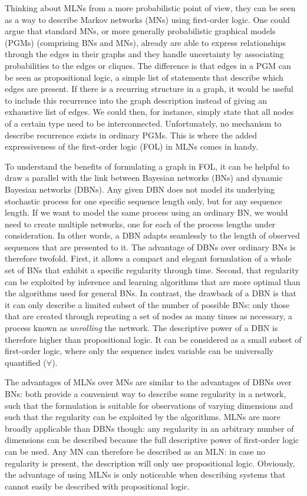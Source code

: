 \documentclass[letterpaper]{article} %
\begin{document}
Thinking about MLNs from a more probabilistic point of view, they can be seen as a way to describe Markov networks (MNs) using first-order logic. One could argue that standard MNs, or more generally probabilistic graphical models (PGMs) (comprising BNs and MNs), already are able to express relationships through the edges in their graphs and they handle uncertainty by associating probabilities to the edges or cliques. The difference is that edges in a PGM can be seen as propositional logic, a simple list of statements that describe which edges are present. If there is a recurring structure in a graph, it would be useful to include this recurrence into the graph description instead of giving an exhaustive list of edges. We could then, for instance, simply state that all nodes of a certain type need to be interconnected. Unfortunately, no mechanism to describe recurrence exists in ordinary PGMs. This is where the added expressiveness of the first-order logic (FOL) in MLNs comes in handy.

To understand the benefits of formulating a graph in FOL, it can be helpful to draw a parallel with the link between Bayesian networks (BNs) and dynamic Bayesian networks (DBNs). Any given DBN does not model its underlying stochastic process for one specific sequence length only, but for any sequence length. If we want to model the same process using an ordinary BN, we would need to create multiple networks, one for each of the process lengths under consideration. In other words, a DBN adapts seamlessly to the length of observed sequences that are presented to it. The advantage of DBNs over ordinary BNs is therefore twofold. First, it allows a compact and elegant formulation of a whole set of BNs that exhibit a specific regularity through time. Second, that regularity can be exploited by inference and learning algorithms that are more optimal than the algorithms used for general BNs. In contrast, the drawback of a DBN is that it can only describe a limited subset of the number of possible BNs: only those that are created through repeating a set of nodes as many times as necessary, a process known as \emph{unrolling} the network. The descriptive power of a DBN is therefore higher than propositional logic. It can be considered as a small subset of first-order logic, where only the sequence index variable can be universally quantified ($\forall$).

The advantages of MLNs over MNs are similar to the advantages of DBNs over BNs: both provide a convenient way to describe some regularity in a network, such that the formulation is suitable for observations of varying dimensions and such that the regularity can be exploited by the algorithms. MLNs are more broadly applicable than DBNs though: any regularity in an arbitrary number of dimensions can be described because the full descriptive power of first-order logic can be used. Any MN can therefore be described as an MLN: in case no regularity is present, the description will only use propositional logic. Obviously, the advantage of using MLNs is only noticeable when describing systems that cannot easily be described with propositional logic.
\end{document}
